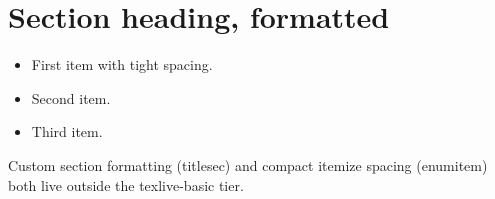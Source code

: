 \documentclass{article}
\begin{document}
\section{Section heading, formatted}
\begin{itemize}
\item First item with tight spacing.
\item Second item.
\item Third item.
\end{itemize}
Custom section formatting (titlesec) and compact itemize
spacing (enumitem) both live outside the texlive-basic tier.
\end{document}
